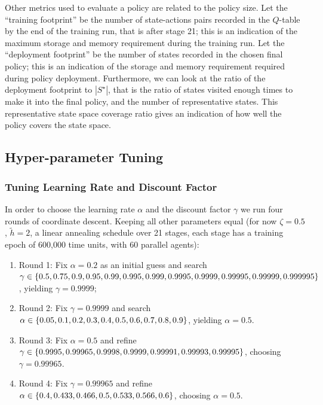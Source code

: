 \documentclass{article}
\newcommand{\splitatcommas}[1]{%
  \begingroup
  \begingroup\lccode`~=`, \lowercase{\endgroup
    \edef~{\mathchar\the\mathcode`, \penalty0 \noexpand\hspace{0pt plus 1em}}%
  }\mathcode`,="8000 #1%
  \endgroup
}
\begin{document}
Other metrics used to evaluate a policy are related to the policy size.
Let the ``training footprint'' be the number of state-actions pairs recorded in
the $Q$-table by the end of the training run, that is after stage 21; this is an
indication of the maximum storage and memory requirement during the training
run.
Let the ``deployment footprint'' be the number of states recorded in the chosen
final policy; this is an indication of the storage and memory requirement
required during policy deployment.
Furthermore, we can look at the ratio of the deployment footprint to
$|S^{\star}|$, that is the ratio of states visited enough times to make it into
the final policy, and the number of representative states.
This representative state space coverage ratio gives an indication of how well
the policy covers the state space.

\subsection{Hyper-parameter Tuning}\label{sec:hpt}
\subsubsection{Tuning Learning Rate and Discount Factor}
In order to choose the learning rate $\alpha$ and the discount factor $\gamma$
we run four rounds of coordinate descent.
Keeping all other parameters equal (for now $\zeta = 0.5$, $\tilde{h} = 2$, a
linear annealing schedule over 21 stages, each stage has a training epoch of
600,000 time units, with 60 parallel agents):

\begin{enumerate}
    \item Round 1: Fix $\alpha = 0.2$ as an initial guess and search $\gamma \in
    \splitatcommas{\{0.5, 0.75, 0.9, 0.95, 0.99, 0.995, 0.999, 0.9995, 0.9999,
    0.99995, 0.99999, 0.999995\}}$, yielding $\gamma = 0.9999$;
    \item Round 2: Fix $\gamma = 0.9999$ and search $\alpha \in \splitatcommas{
    \{0.05, 0.1, 0.2, 0.3, 0.4, 0.5, 0.6, 0.7, 0.8, 0.9\}}$, yielding
    $\alpha = 0.5$.
    \item Round 3: Fix $\alpha = 0.5$ and refine $\gamma \in \splitatcommas{
    \{0.9995, 0.99965, 0.9998, 0.9999, 0.99991, 0.99993, 0.99995\}}$, choosing
    $\gamma = 0.99965$.
    \item Round 4: Fix $\gamma = 0.99965$ and refine $\alpha \in
    \splitatcommas{\{0.4, 0.433, 0.466, 0.5, 0.533, 0.566, 0.6\}}$, choosing
    $\alpha = 0.5$.
\end{enumerate}
\end{document}
